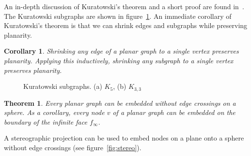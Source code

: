 \documentclass[12pt]{article}
\newtheorem{theorem}{Theorem}[section]
\newtheorem{corollary}{Corollary}[theorem]
\begin{document}
An in-depth discussion of Kuratowski's theorem and a short proof are found in~\cite{thomassen1981kuratowski}. The Kuratowski subgraphs are shown in figure~\ref{fig:kuratowski}. An immediate corollary of Kuratowski's theorem is that we can shrink edges and subgraphs while preserving planarity.\\

\begin{corollary}
  Shrinking any edge of a planar graph to a single vertex preserves planarity. Applying this inductively, shrinking any subgraph to a single vertex preserves planarity.
\end{corollary}

\begin{figure}[!htb]
  \centering
  \hfil
  \caption{Kuratowski subgraphs. (a) $K_5$, (b) $K_{3,3}$}
  \label{fig:kuratowski}
\end{figure}


\begin{theorem}
  Every planar graph can be embedded without edge crossings on a sphere. As a corollary, every node $v$ of a planar graph can be embedded on the boundary of the infinite face $f_{\infty}$.
\end{theorem}

A stereographic projection can be used to embed nodes on a plane onto a sphere without edge crossings (see figure~\ref{fig:stereo}).
\end{document}
